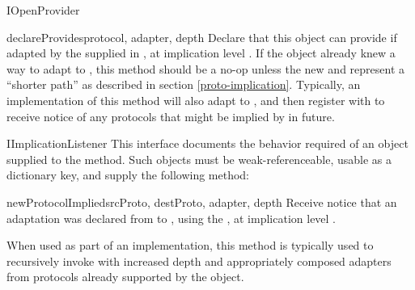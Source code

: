 \begin{verbatim%
}
\begin{verbatim%
}
\begin{verbatim%
}
\begin{verbatim%
}
\begin{classdesc*}{IOpenProvider}
\begin{methoddesc}{declareProvides}{protocol, adapter, depth}
Declare that this object can provide  if adapted by the
 supplied in , at implication level
.  If the object already knew a way to adapt to , this
method should be a no-op unless the new  and  represent
a ``shorter path'' as described in section \ref{proto-implication}.  Typically,
an implementation of this method will also adapt  to
, and then register with 
to receive notice of any protocols that might be implied by 
in future.
\end{methoddesc}

\end{classdesc*}

















\begin{classdesc*}{IImplicationListener}
This interface documents the behavior required of an object supplied to
the  method.  Such objects must
be weak-referenceable, usable as a dictionary key, and supply the following
method:

\begin{methoddesc}{newProtocolImplied}{srcProto, destProto, adapter, depth}
Receive notice that an adaptation was declared from  to
, using the  , at
implication level .

When used as part of an  implementation, this method is
typically used to recursively invoke  with
increased depth and appropriately composed adapters from protocols already
supported by the object.
\end{methoddesc}

\end{classdesc*}
























\end{verbatim%
}
\end{verbatim%
}
\end{verbatim%
}
\end{verbatim%
}
